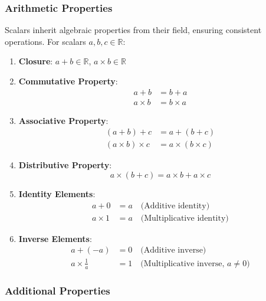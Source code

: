 \documentclass[11pt,a4paper]{article}
\begin{document}
\subsubsection{Arithmetic Properties}

Scalars inherit algebraic properties from their field, ensuring consistent operations. For scalars $a, b, c \in \mathbb{R}$:

\begin{enumerate}
    \item \textbf{Closure}: $a + b \in \mathbb{R}$, $a \times b \in \mathbb{R}$
    
    \item \textbf{Commutative Property}:
    \begin{align}
        a + b &= b + a \\
        a \times b &= b \times a
    \end{align}
    
    \item \textbf{Associative Property}:
    \begin{align}
        (a + b) + c &= a + (b + c) \\
        (a \times b) \times c &= a \times (b \times c)
    \end{align}
    
    \item \textbf{Distributive Property}:
    \begin{equation}
        a \times (b + c) = a \times b + a \times c
    \end{equation}
    
    \item \textbf{Identity Elements}:
    \begin{align}
        a + 0 &= a \quad \text{(Additive identity)} \\
        a \times 1 &= a \quad \text{(Multiplicative identity)}
    \end{align}
    
    \item \textbf{Inverse Elements}:
    \begin{align}
        a + (-a) &= 0 \quad \text{(Additive inverse)} \\
        a \times \frac{1}{a} &= 1 \quad \text{(Multiplicative inverse, } a \neq 0\text{)}
    \end{align}
\end{enumerate}

\subsubsection{Additional Properties}
\end{document}
